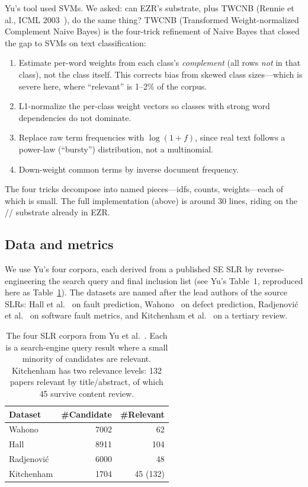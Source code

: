 Yu's tool used SVMs. We asked: can EZR's substrate, plus
TWCNB (Rennie et al., ICML 2003~\cite{rennie2003}), do the
same thing? TWCNB (Transformed Weight-normalized Complement
Naive Bayes) is the four-trick refinement of Naive Bayes that
closed the gap to SVMs on text classification:
\begin{enumerate}
\item Estimate per-word weights from each class's
{\em complement} (all rows {\em not} in that class),
not the class itself. This corrects bias from skewed class
sizes---which is severe here, where ``relevant'' is 1--2\% of
the corpus.
\item L1-normalize the per-class weight vectors so classes
with strong word dependencies do not dominate.
\item Replace raw term frequencies with $\log(1+f)$, since
real text follows a power-law (``bursty'') distribution, not
a multinomial.
\item Down-weight common terms by inverse document frequency.
\end{enumerate}
The four tricks decompose into named pieces---\textsf{idfs},
\textsf{counts}, \textsf{weights}---each of which is small.
The full implementation (above) is around 30 lines, riding on
the // substrate already in EZR.

\subsection*{Data and metrics}

We use Yu's four corpora, each derived from a published SE
SLR by reverse-engineering the search query and final
inclusion list (see Yu's Table~1, reproduced here as
Table~\ref{slr}). The datasets are named after the lead
authors of the source SLRs: Hall et al.~\cite{hall2012} on
fault prediction, Wahono~\cite{wahono2015} on defect
prediction, Radjenovi\'c et al.~\cite{radjenovic2013} on
software fault metrics, and Kitchenham et al.\
\cite{kitchenham2010} on a tertiary review.

\begin{table}[!t]
\caption{The four SLR corpora from Yu et al.\
\cite{yu2018finding}. Each is a search-engine query result
where a small minority of candidates are relevant.
Kitchenham has two relevance levels: 132 papers relevant by
title/abstract, of which 45 survive content review.}
\label{slr}
\begin{center}
\footnotesize
\begin{tabular}{lrr}
\hline
Dataset & \#Candidate & \#Relevant \\
\hline
Wahono       & 7002 & 62 \\
Hall         & 8911 & 104 \\
Radjenovi\'c & 6000 & 48 \\
Kitchenham   & 1704 & 45 (132) \\
\hline
\end{tabular}
\end{center}
\end{table}

